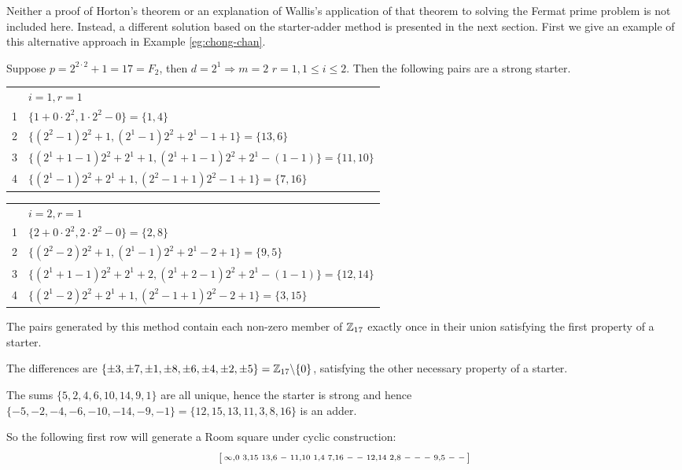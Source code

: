 Neither a proof of Horton's theorem or an explanation of Wallis's application of that theorem to solving the Fermat prime problem is not included here.
Instead, a different solution based on the starter-adder method is presented in the next section.
First we give an example of this alternative approach in Example \ref{eg:chong-chan}.

\begin{example}
\label{eg:chong-chan}
Suppose $p = 2^{2\cdot 2} + 1 = 17 = F_2$, then $d = 2^1 \Rightarrow m = 2$ $r = 1, 1 \leq i \leq 2$.
Then the following pairs are a strong starter.

\begin{tabular}{ll}
     & $i = 1, r = 1$                                                                   \\
  1  & $\{1 + 0 \cdot 2^2,1 \cdot 2^2 - 0\}                              = \{1, 4\}$    \\
  2  & $\{(2^2 - 1)2^2 + 1, (2^1 - 1)2^2 + 2^1 - 1 + 1\}                 = \{13, 6\}$   \\
  3  & $\{(2^1 + 1 - 1)2^2 + 2^1 + 1, (2^1 + 1 - 1)2^2 + 2^1 - (1 - 1)\} = \{11, 10\}$  \\
  4  & $\{(2^1 - 1)2^2 + 2^1 + 1,(2^2 - 1 + 1)2^2 - 1 + 1\}              = \{7, 16\}$
\end{tabular}

\begin{tabular}{ll}
     & $i = 2, r = 1$                                                                   \\
  1  & $\{2 + 0 \cdot 2^2, 2 \cdot 2^2 - 0\}                             = \{2, 8\}$    \\
  2  & $\{(2^2 - 2)2^2 + 1, (2^1 - 1)2^2 + 2^1 - 2 + 1\}                 = \{9, 5\}$    \\
  3  & $\{(2^1 + 1 - 1)2^2 + 2^1 + 2, (2^1 + 2 - 1)2^2 + 2^1 - (1 - 1)\} = \{12, 14\}$  \\
  4  & $\{(2^1 - 2)2^2 + 2^1 + 1, (2^2 - 1 + 1)2^2 - 2 + 1\}             = \{3, 15\}$
\end{tabular}

The pairs generated by this method contain each non-zero member of $\mathbb{Z}_{17}$ exactly once in their union satisfying the first property of a starter.

The differences are
$\{\pm 3, \pm 7, \pm 1, \pm 8, \pm 6, \pm 4, \pm 2, \pm 5\} = \mathbb{Z}_{17} \backslash \{0\}$,
satisfying the other necessary property of a starter.

The sums $\{5, 2, 4, 6, 10, 14, 9, 1\}$ are all unique, hence the starter is strong and hence $\{-5, -2, -4, -6, -10, -14, -9, -1\} = \{12, 15, 13, 11, 3, 8, 16\}$ is an adder.

So the following first row will generate a Room square under cyclic construction:
\begin{equation*}
  \begin{bsmallmatrix}
    \infty, 0 & 3,15 & 13,6 & - & 11,10 & 1,4 & 7,16 & - & - & 12,14 & 2,8 & - & - & - & 9,5 & - & -
  \end{bsmallmatrix}
\end{equation*}
\end{example}

